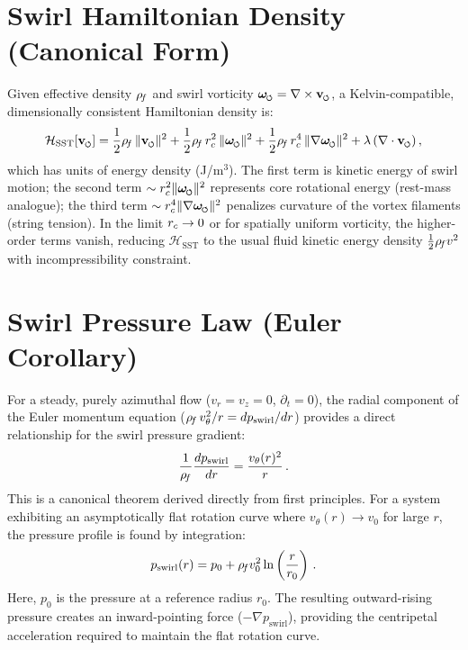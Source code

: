 \documentclass[11pt]{article}
\begin{document}
\section{Swirl Hamiltonian Density (Canonical Form)}
\label{sec:hamiltonian}
Given effective density $\rho_{\!f}$ and swirl vorticity $\omegas = \nabla\times \vswirl$, a Kelvin-compatible, dimensionally consistent Hamiltonian density is:
\begin{equation}
\mathcal{H}_{\text{SST}}[\vswirl] = \frac{1}{2}\rhof\,\|\vswirl\|^2 + \frac{1}{2}\rhof\,\rc^2\,\|\omegas\|^2 + \frac{1}{2}\rhof\,\rc^4\,\|\nabla\omegas\|^2 + \lambda\,(\nabla\cdot \vswirl)\,,
\label{eq:Hamiltonian_SST}
\end{equation}
which has units of energy density (J/m$^3$). The first term is kinetic energy of swirl motion; the second term $\sim \rc^2 \|\omegas\|^2$ represents core rotational energy (rest-mass analogue); the third term $\sim \rc^4\|\nabla\omegas\|^2$ penalizes curvature of the vortex filaments (string tension). In the limit $r_c\to 0$ or for spatially uniform vorticity, the higher-order terms vanish, reducing $\mathcal{H}_{\text{SST}}$ to the usual fluid kinetic energy density $\frac{1}{2}\rho_{\!f} v^2$ with incompressibility constraint.

\section{Swirl Pressure Law (Euler Corollary)}
\label{sec:darkpressure}
For a steady, purely azimuthal flow ($v_r=v_z=0$, $\partial_t=0$), the radial component of the Euler momentum equation ($\rho_{\!f}\,v_\theta^2/r = dp_{\text{swirl}}/dr$) provides a direct relationship for the swirl pressure gradient:
\begin{equation}
\frac{1}{\rho_{\!f}}\frac{dp_{\text{swirl}}}{dr} = \frac{v_\theta(r)^2}{r}\,.
\label{eq:swirl_pressure_law}
\end{equation}
This is a canonical theorem derived directly from first principles. For a system exhibiting an asymptotically flat rotation curve where $v_\theta(r) \to v_0$ for large $r$, the pressure profile is found by integration:
\begin{equation}
p_{\text{swirl}}(r) = p_0 + \rho_{\!f} v_0^2 \ln\left(\frac{r}{r_0}\right)\,.
\end{equation}
Here, $p_0$ is the pressure at a reference radius $r_0$. The resulting outward-rising pressure creates an inward-pointing force ($-\nabla p_{\text{swirl}}$), providing the centripetal acceleration required to maintain the flat rotation curve.
\end{document}
